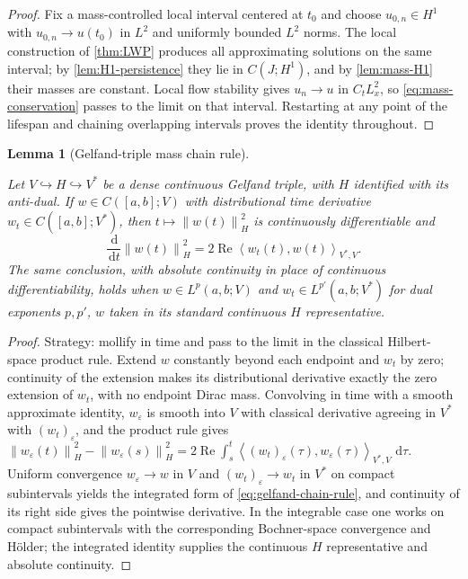 \documentclass[11pt,oneside]{book}
\providecommand{\uses}[1]{}
\newtheorem{lemma}[theorem]{Lemma}
\theoremstyle{definition}
\theoremstyle{remark}
\newcommand{\1}{\mathbf 1}
\newcommand{\Rea}{\operatorname{Re}}
\newcommand{\dd}{\,\mathrm d}
\newcommand{\norm}[1]{\left\lVert #1\right\rVert}
\newcommand{\pair}[2]{\left\langle #1,#2\right\rangle}
\newcommand{\eps}{\varepsilon}
\begin{document}
\begin{proof}
\uses{thm:LWP, lem:H1-persistence, lem:mass-H1}
Fix a mass-controlled local interval centered at $t_0$ and choose
$u_{0,n}\in H^1$ with $u_{0,n}\to u(t_0)$ in $L^2$ and uniformly bounded $L^2$
norms. The local construction of \cref{thm:LWP} produces all approximating
solutions on the same interval; by \cref{lem:H1-persistence} they lie in
$C(J;H^1)$, and by \cref{lem:mass-H1} their masses are constant. Local flow
stability gives $u_n\to u$ in $C_tL^2_x$, so \eqref{eq:mass-conservation}
passes to the limit on that interval. Restarting at any point of the lifespan
and chaining overlapping intervals proves the identity throughout.
\end{proof}

\begin{lemma}[Gelfand-triple mass chain rule]\label{lem:gelfand-chain-rule}
\uses{def:Hs-space}
Let $V\hookrightarrow H\hookrightarrow V^*$ be a dense continuous Gelfand
triple, with $H$ identified with its anti-dual. If $w\in C([a,b];V)$ with
distributional time derivative $w_t\in C([a,b];V^*)$, then
$t\mapsto\norm{w(t)}_H^2$ is continuously differentiable and
\begin{equation}
 \frac{\dd}{\dd t}\norm{w(t)}_H^2
 =2\Rea\pair{w_t(t)}{w(t)}_{V^*,V}.                \label{eq:gelfand-chain-rule}
\end{equation}
The same conclusion, with absolute continuity in place of continuous
differentiability, holds when $w\in L^p(a,b;V)$ and $w_t\in L^{p'}(a,b;V^*)$
for dual exponents $p,p'$, $w$ taken in its standard continuous $H$
representative.
\end{lemma}

\begin{proof}
\uses{def:Hs-space}
Strategy: mollify in time and pass to the limit in the classical
Hilbert-space product rule. Extend $w$ constantly beyond each endpoint and
$w_t$ by zero; continuity of the extension makes its distributional derivative
exactly the zero extension of $w_t$, with no endpoint Dirac mass. Convolving
in time with a smooth approximate identity, $w_\eps$ is smooth into $V$ with
classical derivative agreeing in $V^*$ with $(w_t)_\eps$, and the product rule
gives
$\norm{w_\eps(t)}_H^2-\norm{w_\eps(s)}_H^2
 =2\Rea\int_s^t\pair{(w_t)_\eps(\tau)}{w_\eps(\tau)}_{V^*,V}\,\dd\tau$.
Uniform convergence $w_\eps\to w$ in $V$ and $(w_t)_\eps\to w_t$ in $V^*$ on
compact subintervals yields the integrated form of
\eqref{eq:gelfand-chain-rule}, and continuity of its right side gives the
pointwise derivative. In the integrable case one works on compact
subintervals with the corresponding Bochner-space convergence and H\"older;
the integrated identity supplies the continuous $H$ representative and
absolute continuity.
\end{proof}
\end{document}
